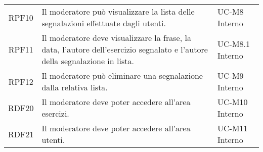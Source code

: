 \begin{tabularx}{\textwidth}{| c | p{10cm} | X |}
		RPF10 & Il moderatore può visualizzare la lista delle segnalazioni effettuate dagli utenti. & UC-M8 \newline Interno\\
		RPF11 & Il moderatore deve visualizzare la frase, la data, l'autore dell'esercizio segnalato e l'autore della segnalazione in lista. & UC-M8.1 \newline Interno\\
		RPF12 & Il moderatore può eliminare una segnalazione dalla relativa lista. & UC-M9 \newline Interno\\
		RDF20 & Il moderatore deve poter accedere all'area esercizi. & UC-M10 \newline Interno\\
		RDF21 & Il moderatore deve poter accedere all'area utenti. & UC-M11 \newline Interno\\
		

\end{tabularx}
